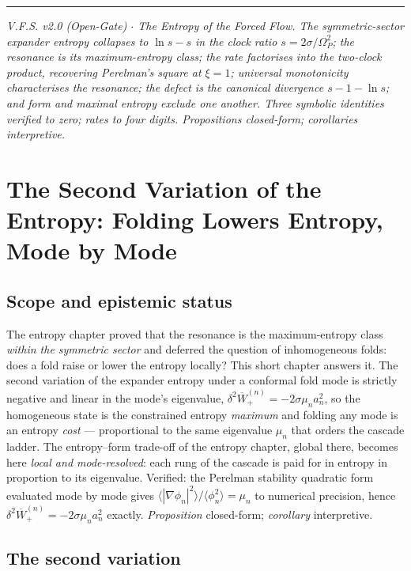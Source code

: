 \documentclass[11pt,a4paper,oneside]{book}
\newcommand{\Op}{\Omega_P}
\newcommand{\Wp}{\overline W_{+}}
\theoremstyle{plain}
\theoremstyle{definition}
\theoremstyle{remark}
\begin{document}
\vspace{0.5em}
\hrule
\smallskip
\noindent\footnotesize\emph{V.F.S. v2.0 (Open-Gate) $\cdot$ The Entropy of the Forced Flow. The
symmetric-sector expander entropy collapses to $\ln s-s$ in the clock ratio $s=2\sigma/\Op^2$; the
resonance is its maximum-entropy class; the rate factorises into the two-clock product, recovering
Perelman's square at $\xi=1$; universal monotonicity characterises the resonance; the defect is the
canonical divergence $s-1-\ln s$; and form and maximal entropy exclude one another. Three symbolic
identities verified to zero; rates to four digits. Propositions closed-form; corollaries
interpretive.}

\chapter{The Second Variation of the Entropy: Folding Lowers Entropy, Mode by Mode}

\section*{Scope and epistemic status}
The entropy chapter proved that the resonance is the maximum-entropy class \emph{within the symmetric
sector} and deferred the question of inhomogeneous folds: does a fold raise or lower the entropy
locally? This short chapter answers it. The second variation of the expander entropy under a conformal
fold mode is strictly negative and linear in the mode's eigenvalue,
$\delta^2\Wp^{(n)}=-2\sigma\mu_n a_n^2$, so the homogeneous state is the constrained entropy
\emph{maximum} and folding any mode is an entropy \emph{cost} --- proportional to the same eigenvalue
$\mu_n$ that orders the cascade ladder. The entropy--form trade-off of the entropy chapter, global
there, becomes here \emph{local and mode-resolved}: each rung of the cascade is paid for in entropy in
proportion to its eigenvalue. Verified: the Perelman stability quadratic form evaluated mode by mode
gives $\langle|\nabla\phi_n|^2\rangle/\langle\phi_n^2\rangle=\mu_n$ to numerical precision, hence
$\delta^2\Wp^{(n)}=-2\sigma\mu_n a_n^2$ exactly. \emph{Proposition} closed-form; \emph{corollary}
interpretive.

\section{The second variation}
\end{document}
